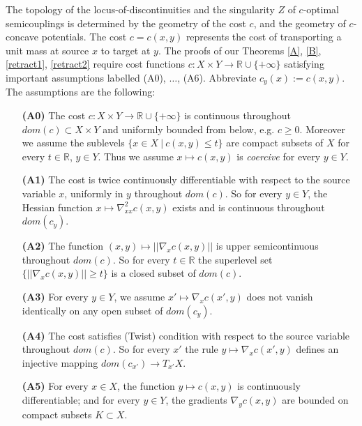 \documentclass[12pt]{amsart}
\theoremstyle{definition}
\theoremstyle{remark}
\newcommand{\bR}{\mathbb{R}}
\begin{document}
 The topology of the locus-of-discontinuities and the singularity $Z$ of $c$-optimal semicouplings is determined by the geometry of the cost $c$, and the geometry of $c$-concave potentials. The cost $c=c(x,y)$ represents the cost of transporting a unit mass at source $x$ to target at $y$. The proofs of our Theorems \ref{A}, \ref{B}, \ref{retract1}, \ref{retract2} require cost functions $c: X\times Y \to \bR \cup \{+\infty\}$ satisfying important assumptions labelled (A0), $\ldots$, (A6). Abbreviate $c_y(x):=c(x,y)$. The assumptions are the following:

\begin{itemize}
\item[\textbf{(A0)}] The cost $c:X\times Y \to \bR \cup \{+\infty\}$ is continuous throughout $dom(c) \subset X\times Y$ and uniformly bounded from below, e.g. $c\geq 0$. Moreover we assume the sublevels $\{x\in X~|~ c(x,y) \leq t\}$ are compact subsets of $X$ for every $t\in \bR$, $y\in Y$. Thus we assume $x\mapsto c(x,y)$ is \emph{coercive} for every $y\in Y$.

\item[\textbf{(A1)}] The cost is twice continuously differentiable with respect to the source variable $x$, uniformly in $y$ throughout $dom(c)$. So for every $y\in Y$, the Hessian function $x\mapsto \nabla_{xx}^2 c(x,y)$ exists and is continuous throughout $dom(c_y)$. 

\item[\textbf{(A2)}] The function $(x,y)\mapsto ||\nabla_x c(x,y)||$ is upper semicontinuous throughout $dom(c)$. So for every $t\in \bR$ the superlevel set $\{ ||\nabla_x c(x,y)|| \geq t\}$ is a closed subset of $dom(c)$. 

\item[\textbf{(A3)}] For every $y\in Y$, we assume $x'\mapsto \nabla_x c(x',y)$ does not vanish identically on any open subset of $dom(c_y)$.  

\item[\textbf{(A4)}] The cost satisfies (Twist) condition with respect to the source variable throughout $dom(c)$. So for every $x'$ the rule $y\mapsto \nabla_x c(x',y)$ defines an injective mapping $dom(c_{x'}) \to T_{x'} X$. 

\item[\textbf{(A5)}]\label{A+} For every $x\in X$, the function $y\mapsto c(x,y)$ is continuously differentiable; and for every $y\in Y$, the gradients $\nabla_y c(x,y)$ are bounded on compact subsets $K\subset X$.
\end{itemize}
\end{document}
